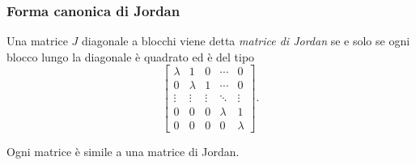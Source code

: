 \begin{frame}
	\frametitle{Forma canonica di Jordan}
		\begin{definition}
			Una matrice $J$ diagonale a blocchi viene detta \emph{matrice di Jordan} se e solo se
			ogni blocco lungo la diagonale \`e quadrato ed \`e del tipo
			\[
				\begin{bmatrix}
					\lambda     &    1         &    0     &   \cdots   &    0    \\
						0       &    \lambda   &    1     &   \cdots   &    0    \\
					\vdots      &    \vdots    &  \vdots  &   \ddots   & \vdots  \\
						0       &       0      &     0    &  \lambda   &    1    \\
						0       &       0      &     0    &     0      & \lambda
				\end{bmatrix}.
			\]
		\end{definition}
		 Ogni matrice \`e simile a una matrice di Jordan.
\end{frame}